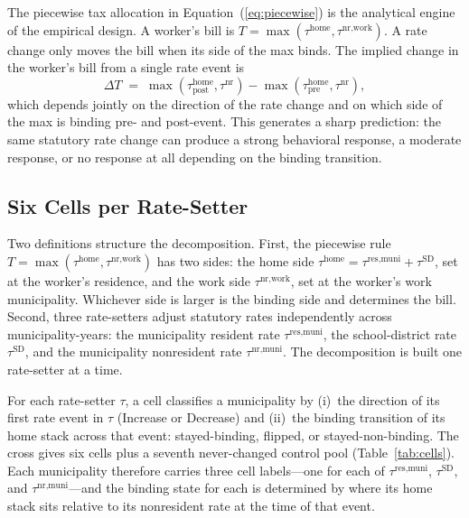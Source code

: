 \documentclass[12pt]{article}
\begin{document}
The piecewise tax allocation in Equation~(\ref{eq:piecewise}) is the
analytical engine of the empirical design. A worker's bill is
$T = \max(\tau^{\text{home}}, \tau^{\text{nr,work}})$. A rate change
only moves the bill when its side of the max binds. The
implied change in the worker's bill from a single rate event is
\[
  \Delta T \;=\; \max(\tau^{\text{home}}_{\text{post}}, \tau^{\text{nr}})
              - \max(\tau^{\text{home}}_{\text{pre}},  \tau^{\text{nr}}),
\]
which depends jointly on the direction of the rate change and on
which side of the max is binding pre- and post-event. This
generates a sharp prediction: the same statutory rate change can
produce a strong behavioral response, a moderate response, or no
response at all depending on the binding transition.

\subsection{Six Cells per Rate-Setter}
\label{subsec:cells}

Two definitions structure the decomposition. First, the piecewise
rule $T = \max(\tau^{\text{home}}, \tau^{\text{nr,work}})$ has two
sides: the home side
$\tau^{\text{home}} = \tau^{\text{res,muni}} + \tau^{\text{SD}}$,
set at the worker's residence, and the work side
$\tau^{\text{nr,work}}$, set at the worker's work municipality.
Whichever side is larger is the binding side and determines
the bill. Second, three rate-setters adjust statutory rates
independently across municipality-years: the municipality resident
rate $\tau^{\text{res,muni}}$, the school-district rate
$\tau^{\text{SD}}$, and the municipality nonresident rate
$\tau^{\text{nr,muni}}$. The decomposition is built one rate-setter
at a time.

For each rate-setter $\tau$, a cell classifies a municipality
by (i)~the direction of its first rate event in $\tau$ (Increase or
Decrease) and (ii)~the binding transition of its home stack
across that event: stayed-binding, flipped, or stayed-non-binding.
The cross gives six cells plus a seventh never-changed control pool
(Table~\ref{tab:cells}). Each municipality therefore carries three
cell labels---one for each of $\tau^{\text{res,muni}}$,
$\tau^{\text{SD}}$, and $\tau^{\text{nr,muni}}$---and the binding
state for each is determined by where its home stack sits relative
to its nonresident rate at the time of that event.
\end{document}
